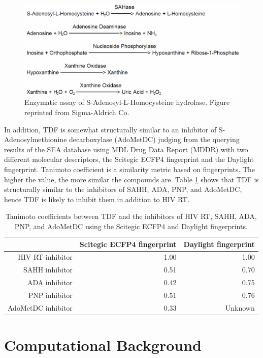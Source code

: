 \begin{figure}
\centering
\includegraphics[width=\textwidth]{VirtualScreening/Figures/EnzymaticAssay.png}
\caption{Enzymatic assay of S-Adenosyl-L-Homocysteine hydrolase. Figure reprinted from Sigma-Aldrich Co.}
\label{fig:EnzymaticAssay}
\end{figure}

In addition, TDF is somewhat structurally similar to an inhibitor of S-Adenosylmethionine decarboxylase (AdoMetDC) judging from the querying results of the SEA database \citep{380-2007} using MDL Drug Data Report (MDDR) with two different molecular descriptors, the Scitegic ECFP4 fingerprint and the Daylight fingerprint. Tanimoto coefficient is a similarity metric based on fingerprints. The higher the value, the more similar the compounds are. Table \ref{tab:TanimotoCoefficients} shows that TDF is structurally similar to the inhibitors of SAHH, ADA, PNP, and AdoMetDC, hence TDF is likely to inhibit them in addition to HIV RT.

\begin{table}
\centering
\begin{tabular*}
{\textwidth}
{@{\extracolsep{\fill}}rrr}
\toprule
& Scitegic ECFP4 fingerprint & Daylight fingerprint\\
\midrule
HIV RT inhibitor & 1.00 & 1.00 \\
SAHH inhibitor & 0.51 & 0.70 \\
ADA inhibitor & 0.42 & 0.75 \\
PNP inhibitor & 0.51 & 0.76 \\
AdoMetDC inhibitor & 0.33 & Unknown \\
\bottomrule
\end{tabular*}
\caption{Tanimoto coefficients between TDF and the inhibitors of HIV RT, SAHH, ADA, PNP, and AdoMetDC using the Scitegic ECFP4 and Daylight fingerprints.}
\label{tab:TanimotoCoefficients}
\end{table}

\section{Computational Background}

